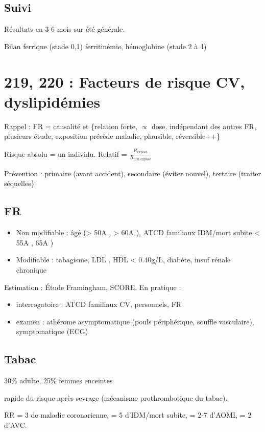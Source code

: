 \documentclass[11pt]{article}
\begin{document}
\subsection{Suivi}
\label{sec:org95108c4}
Résultats en 3-6 mois sur été générale. 

Bilan ferrique (stade 0,1) ferritinémie, hémoglobine (stade 2 à 4)

\section{219, 220 :  Facteurs de risque CV, dyslipidémies}
\label{sec:org0e120d3}
Rappel : FR = causalité et \{relation forte, \(\propto\) dose, indépendant des autres
FR, plusieurs étude, exposition précède maladie, plausible, réversible++\}

Risque absolu = un individu. Relatif = \(\frac{R_{\text{exposé}}}{R_{\text{non exposé}}}\)

Prévention : primaire (avant accident), secondaire (éviter nouvel), tertaire
(traiter séquelles\}

\subsection{FR}
\label{sec:orge2e593a}
\begin{itemize}
\item Non modifiable : âgé (> 50A \male, > 60A \female), ATCD familiaux IDM/mort
subite < 55A \male, 65A \female)
\item Modifiable : tabagisme, LDL \inc, HDL < 0.40g/L, diabète, insuf rénale
chronique
\end{itemize}

Estimation : Étude Framingham, SCORE. En pratique : 
\begin{itemize}
\item interrogatoire  : ATCD familiaux CV, personnels, FR
\item examen : athérome asymptomatique (pouls périphérique, souffle vasculaire),
symptomatique (ECG)
\end{itemize}

\subsection{Tabac}
\label{sec:org659cbec}
30\% adulte, 25\% femmes enceintes

\inc rapide du risque après sevrage (mécanisme prothrombotique du tabac). 

RR = 3 de maladie coronarienne, = 5 d'IDM/mort subite, = 2-7 d'AOMI, = 2 d'AVC.
\end{document}
